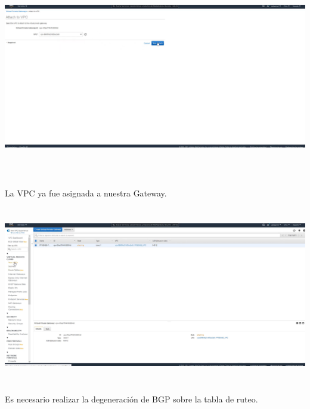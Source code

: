 \documentclass{article} %
\begin{document}
\noindent 

\noindent 

\noindent 

\noindent \includegraphics*[width=6.76in, height=3.49in, trim=0.00in 0.24in 1.21in 0.00in]{image11}

\noindent 

\noindent 

\noindent 

\noindent 

\noindent 

\noindent 

\noindent La VPC ya fue asignada a nuestra Gateway. 

\noindent 

\noindent \includegraphics*[width=6.59in, height=3.05in, trim=0.00in 1.12in 2.20in 0.00in]{image12}

\noindent 

\noindent Es necesario realizar la degeneraci\'{o}n de BGP sobre la tabla de ruteo. 
\end{document}
